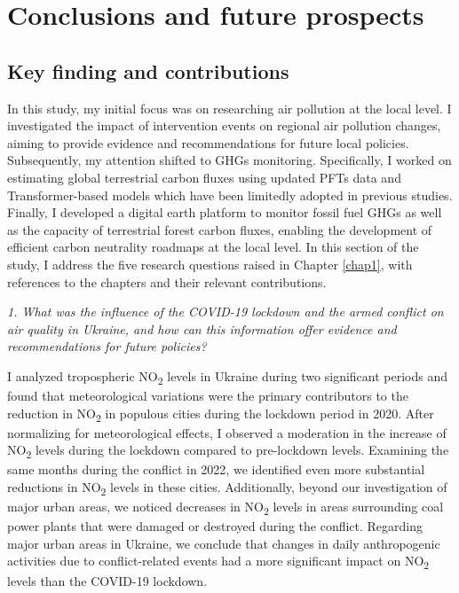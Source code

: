 \chapter{Conclusions and future prospects} \label{chap6}
\section{Key finding and contributions}
In this study, my initial focus was on researching air pollution at the local level. I investigated the impact of intervention events on regional air pollution changes, aiming to provide evidence and recommendations for future local policies. Subsequently, my attention shifted to GHGs monitoring. Specifically, I worked on estimating global terrestrial carbon fluxes using updated PFTs data and Transformer-based models which have been limitedly adopted in previous studies. Finally, I developed a digital earth platform to monitor fossil fuel GHGs as well as the capacity of terrestrial forest carbon fluxes, enabling the development of efficient carbon neutrality roadmaps at the local level. In this section of the study, I address the five research questions raised in Chapter \ref{chap1}, with references to the chapters and their relevant contributions. \par

\textit{1. What was the influence of the COVID-19 lockdown and the armed conflict on air quality in Ukraine, and how can this information offer evidence and recommendations for future policies?} \par
I analyzed tropospheric NO\textsubscript{2} levels in Ukraine during two significant periods and found that meteorological variations were the primary contributors to the reduction in NO\textsubscript{2} in populous cities during the lockdown period in 2020. After normalizing for meteorological effects, I observed a moderation in the increase of NO\textsubscript{2} levels during the lockdown compared to pre-lockdown levels. Examining the same months during the conflict in 2022, we identified even more substantial reductions in NO\textsubscript{2} levels in these cities. Additionally, beyond our investigation of major urban areas, we noticed decreases in NO\textsubscript{2} levels in areas surrounding coal power plants that were damaged or destroyed during the conflict. Regarding major urban areas in Ukraine, we conclude that changes in daily anthropogenic activities due to conflict-related events had a more significant impact on NO\textsubscript{2} levels than the COVID-19 lockdown. \par

